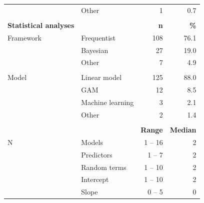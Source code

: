 \documentclass[
]{article}
\begin{document}
\begin{table}
{\begin{tabular}[t]{llrr}
 & Other & 1 & 0.7\\
 &  &  \vphantom{2} & \\
\bf{Statistical analyses} &  & \bf{n} & \bf{\%}\\
\midrule
\hspace{1em}Framework & Frequentist & 108 & 76.1\\
 & Bayesian & 27 & 19.0\\
 & Other & 7 & 4.9\\
 &  &  \vphantom{1} & \\
\hspace{1em}Model & Linear model & 125 & 88.0\\
 & GAM & 12 & 8.5\\
 & Machine learning & 3 & 2.1\\
 & Other & 2 & 1.4\\
 &  &  & \\
 &  & \bf{Range} & \bf{Median}\\
\hspace{1em}N & Models & 1 -- 16 & 2\\
 & Predictors & 1 -- 7 & 2\\
 & Random terms & 1 -- 10 & 2\\
\hspace{1em} & \hspace{1em}Intercept & \hspace{1em}1 -- 10 & \hspace{1em}2\\
\hspace{1em} & \hspace{1em}Slope & \hspace{1em}0 -- 5 & \hspace{1em}0\\
\bottomrule
\end{tabular}}
\end{table}
\end{document}
